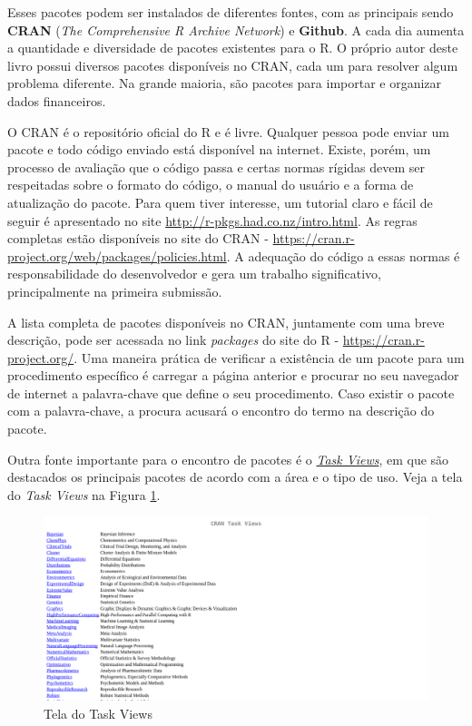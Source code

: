 \documentclass[
  11pt,
]{book}
\begin{document}
Esses pacotes podem ser instalados de diferentes fontes, com as principais sendo \textbf{CRAN} (\emph{The Comprehensive R Archive Network}) e \textbf{Github}. A cada dia aumenta a quantidade e diversidade de pacotes existentes para o R. O próprio autor deste livro possui diversos pacotes disponíveis no CRAN, cada um para resolver algum problema diferente. Na grande maioria, são pacotes para importar e organizar dados financeiros.

O CRAN é o repositório oficial do R e é livre. Qualquer pessoa pode enviar um pacote e todo código enviado está disponível na internet. Existe, porém, um processo de avaliação que o código passa e certas normas rígidas devem ser respeitadas sobre o formato do código, o manual do usuário e a forma de atualização do pacote. Para quem tiver interesse, um tutorial claro e fácil de seguir é apresentado no site \url{http://r-pkgs.had.co.nz/intro.html}. As regras completas estão disponíveis no site do CRAN - \url{https://cran.r-project.org/web/packages/policies.html}. A adequação do código a essas normas é responsabilidade do desenvolvedor e gera um trabalho significativo, principalmente na primeira submissão.

A lista completa de pacotes disponíveis no CRAN, juntamente com uma breve descrição, pode ser acessada no link \emph{packages} do site do R - \url{https://cran.r-project.org/}. Uma maneira prática de verificar a existência de um pacote para um procedimento específico é carregar a página anterior e procurar no seu navegador de internet a palavra-chave que define o seu procedimento. Caso existir o pacote com a palavra-chave, a procura acusará o encontro do termo na descrição do pacote.

Outra fonte importante para o encontro de pacotes é o \href{https://cran.r-project.org/web/views/}{\emph{Task Views}}, em que são destacados os principais pacotes de acordo com a área e o tipo de uso. Veja a tela do \emph{Task Views} na Figura \ref{fig:TaskViews}.

\begin{figure}[!htbp]

{\centering \includegraphics[width=1\linewidth]{00-text-resources/figs/TaskViews} 

}

\caption{Tela do Task Views}\label{fig:TaskViews}
\end{figure}
\end{document}
